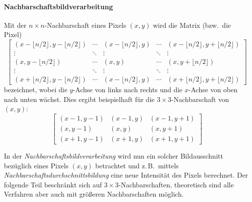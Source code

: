 \documentclass[a4paper, 11pt, accentcolor = tud3b]{tudreport}
\newcommand{\bzw}{bzw.~}
\newcommand{\zB}{z.\,B.~}
\begin{document}
					\paragraph{Nachbarschaftsbildverarbeitung}
						Mit der \( n \times n \)-Nachbarschaft eines Pixels \( (x, y) \) wird die Matrix (\bzw die Pixel)
						\begin{equation*}
							\begin{bmatrix}
								(x - \lfloor n/2 \rfloor, y - \lfloor n/2 \rfloor) & \cdots & (x - \lfloor n/2 \rfloor, y) & \cdots & (x - \lfloor n/2 \rfloor, y + \lfloor n/2 \rfloor) \\
								\vdots                                             & \ddots & \vdots                       & \ddots & \vdots                                             \\
								(x, y - \lfloor n/2 \rfloor)                       & \cdots & (x, y)                       & \cdots & (x, y + \lfloor n/2 \rfloor)                       \\
								\vdots                                             & \ddots & \vdots                       & \ddots & \vdots                                             \\
								(x + \lfloor n/2 \rfloor, y - \lfloor n/2 \rfloor) & \cdots & (x - \lfloor n/2 \rfloor, y) & \cdots & (x + \lfloor n/2 \rfloor, y + \lfloor n/2 \rfloor)
							\end{bmatrix}
						\end{equation*}
						bezeichnet, wobei die \(y\)-Achse von links nach rechts und die \(x\)-Achse von oben nach unten wächst. Dies ergibt beispielhaft für die \( 3 \times 3 \)-Nachbarschaft von \( (x, y) \):
						\begin{equation*}
							\begin{bmatrix}
								(x - 1, y - 1) & (x - 1, y) & (x - 1, y + 1) \\
								(x, y - 1)     & (x, y)     & (x, y + 1)     \\
								(x + 1, y - 1) & (x + 1, y) & (x + 1, y + 1)
							\end{bmatrix}
						\end{equation*}
						
						In der \emph{Nachbarschaftsbildverarbeitung} wird nun ein solcher Bildausschnitt bezüglich eines Pixels \( (x, y) \) betrachtet und \zB mittels \emph{Nachbarschaftsdurchschnittsbildung} eine neue Intensität des Pixels berechnet. Der folgende Teil beschränkt sich auf \( 3 \times 3 \)-Nachbarschaften, theoretisch sind alle Verfahren aber auch mit größeren Nachbarschaften möglich.
						
\end{document}
